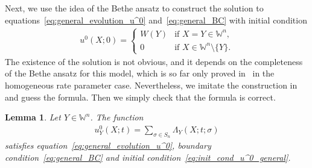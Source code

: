 \documentclass[11pt]{article}
\numberwithin{equation}{section}
\newtheorem{Lemma}[Theorem]{Lemma}
 { \theoremstyle{definition}
\newtheorem{Remark}[Theorem]{Remark} }
\newcommand{\Weylchamber}{\mathbb{W}}
\begin{document}
Next, we use the idea of the Bethe ansatz to construct the solution to equations~\eqref{eq:general_evolution_u^0} and~\eqref{eq:general_BC} with initial condition
\begin{gather} \label{eq:init_cond_u^0_general}
 u^0(X; 0) =
 \begin{cases}
 W(Y) & \text{if $X = Y \in \Weylchamber^n$}, \\
 0 & \text{if $X \in \Weylchamber^n {\setminus} \{ Y \}$}.
 \end{cases}
\end{gather}
The existence of the solution is not obvious, and it depends on the completeness of the Bethe ansatz for this model, which is so far only proved in~\cite{Borodin-Corwin-Petrov-Sasamoto15} in the homogeneous rate parameter case. Nevertheless, we imitate the construction in~\cite{Korhonen-Lee14} and guess the formula. Then we simply check that the formula is correct.

\begin{Lemma} \label{lem:Bethe_ansatz_solution}
 Let $Y \in \Weylchamber^n$. The function
 \begin{gather*}
 u^0_Y(X; t) = \sum_{\sigma \in S_n} \Lambda_Y(X; t; \sigma)
 \end{gather*}
 satisfies equation~\eqref{eq:general_evolution_u^0}, boundary condition~\eqref{eq:general_BC} and initial condition~\eqref{eq:init_cond_u^0_general}.
\end{Lemma}
\end{document}
